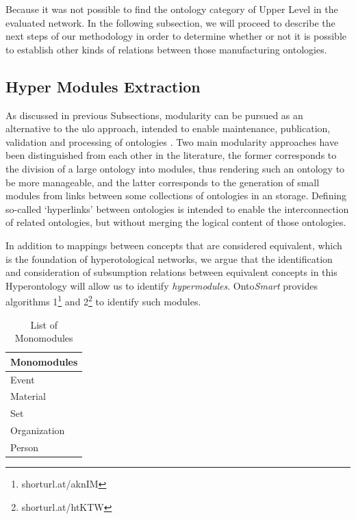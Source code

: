 Because it was not possible to find the ontology category of Upper Level in the evaluated network. In the following subsection, we will proceed to describe the next steps of our methodology in order to determine whether or not it is possible to establish other kinds of relations between those manufacturing ontologies. 

\subsection{Hyper Modules Extraction}\label{subsection4.2.5}

As discussed in previous Subsections, modularity can be pursued as an alternative to the \gls{ulo} approach, intended to enable maintenance, publication, validation and processing of ontologies \cite{daquin_modular_2009}. Two main modularity approaches have been distinguished from each other in the literature, the former corresponds to the division of a large ontology into modules, thus rendering such an ontology to be more manageable, and the latter corresponds to the generation of small modules from links between some collections of ontologies in an storage.  Defining so-called ‘hyperlinks’ between ontologies is intended to enable the interconnection of    related ontologies, but without merging the logical content of those ontologies. 

In addition to mappings between concepts that are considered equivalent, which is the foundation of hyperotological networks, we argue that the identification and consideration of subsumption relations   between equivalent concepts in this Hyperontology will allow us to identify \textit{hypermodules}. Onto\textit{Smart} provides algorithms 1\footnote{shorturl.at/aknIM} and 2\footnote{shorturl.at/htKTW} to identify such modules. 

 

\begin{table}[tp]%

\caption{List of Monomodules}
\label{table4.6}\centering
\begin{tabular}{ p{4cm}}\toprule
	
	\textbf{Monomodules} \\\toprule
	Event\\\toprule
	Material\\\toprule
	Set\\\toprule
	Organization\\\toprule
	Person\\\toprule
	
\end{tabular}

\end{table}


